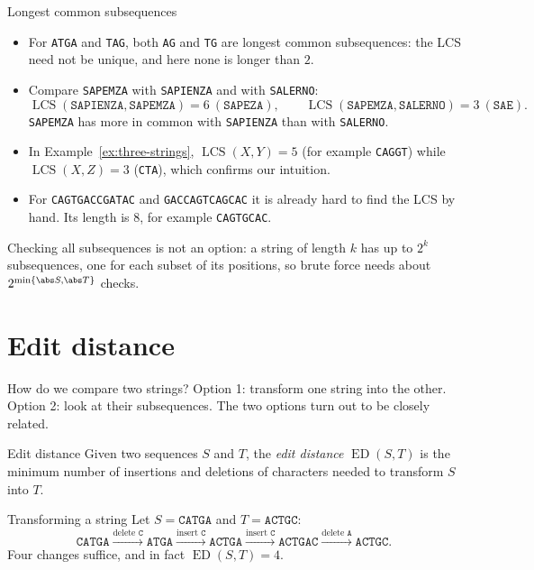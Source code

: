 \documentclass[a4paper,12pt,oneside]{report}
\newcommand{\ED}{\operatorname{ED}}
\newcommand{\LCS}{\operatorname{LCS}}
\begin{document}
\begin{framedexample}{Longest common subsequences}\label{ex:lcs}
\begin{itemize}
  \item For \texttt{ATGA} and \texttt{TAG}, both \texttt{AG} and
    \texttt{TG} are longest common subsequences: the LCS need not be
    unique, and here none is longer than $2$.
  \item Compare \texttt{SAPEMZA} with \texttt{SAPIENZA} and with
    \texttt{SALERNO}:
    \[
      \LCS(\texttt{SAPIENZA},\texttt{SAPEMZA})=6\ (\texttt{SAPEZA}),
      \qquad
      \LCS(\texttt{SAPEMZA},\texttt{SALERNO})=3\ (\texttt{SAE}).
    \]
    \texttt{SAPEMZA} has more in common with \texttt{SAPIENZA} than
    with \texttt{SALERNO}.
  \item In Example~\ref{ex:three-strings},
    $\LCS(X,Y)=5$ (for example \texttt{CAGGT}) while $\LCS(X,Z)=3$
    (\texttt{CTA}), which confirms our intuition.
  \item For \texttt{CAGTGACCGATAC} and \texttt{GACCAGTCAGCAC} it is
    already hard to find the LCS by hand. Its length is $8$, for
    example \texttt{CAGTGCAC}.
\end{itemize}
\end{framedexample}

Checking all subsequences is not an option: a string of length $k$ has
up to $2^k$ subsequences, one for each subset of its positions, so
brute force needs about $2^{\min\{\abs S,\abs T\}}$ checks.

\section{Edit distance}

How do we compare two strings? Option 1: transform one string into the
other. Option 2: look at their subsequences. The two options turn out
to be closely related.

\begin{frameddefn}{Edit distance}\label{def:edit-distance}
Given two sequences $S$ and $T$, the \emph{edit distance} $\ED(S,T)$
is the minimum number of insertions and deletions of characters needed
to transform $S$ into $T$.
\end{frameddefn}

\begin{framedexample}{Transforming a string}\label{ex:edit-distance}
Let $S=\texttt{CATGA}$ and $T=\texttt{ACTGC}$:
\[
  \texttt{CATGA}
  \xrightarrow{\text{delete }\texttt{C}}\texttt{ATGA}
  \xrightarrow{\text{insert }\texttt{C}}\texttt{ACTGA}
  \xrightarrow{\text{insert }\texttt{C}}\texttt{ACTGAC}
  \xrightarrow{\text{delete }\texttt{A}}\texttt{ACTGC}.
\]
Four changes suffice, and in fact $\ED(S,T)=4$.
\end{framedexample}
\end{document}
